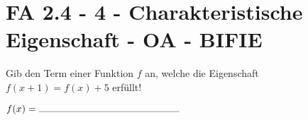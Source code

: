\section{FA 2.4 - 4 - Charakteristische Eigenschaft - OA - BIFIE}

\begin{beispiel}[FA 2.4]{1} %
Gib den Term einer Funktion $f$ an, welche die Eigenschaft $f(x+1)=f(x)+5$ erfüllt!
\leer

$f(x)=\rule{5cm}{0.3pt}$
\leer

\end{beispiel}